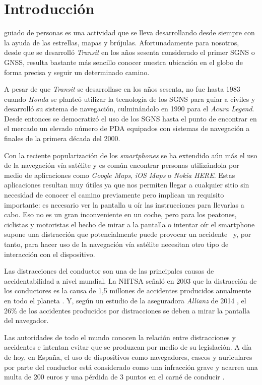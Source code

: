 \chapter{Introducción}
\label{chap:intro}

 guiado de personas es una actividad que se lleva desarrollando desde siempre con la
ayuda de las estrellas, mapas y brújulas. Afortunadamente para nosotros, desde que se desarrolló
\emph{Transit} en los años sesenta considerado el primer \acf{SGNS} o \acf{GNSS}, resulta
bastante más sencillo conocer nuestra ubicación en el globo de forma precisa y seguir un determinado
camino.

A pesar de que \emph{Transit} se desarrollase en los años sesenta, no fue hasta 1983 cuando
\emph{Honda} se planteó utilizar la tecnología de los \acs{SGNS} para guiar a civiles y desarrolló
su sistema de navegación, culminándolo en 1990 para el \emph{Acura Legend}. Desde entonces se
democratizó el uso de los \acs{SGNS} hasta el punto de encontrar en el mercado un elevado número de
\acf{PDA} equipados con sistemas de navegación a finales de la primera década del 2000.

Con la reciente popularización de los \emph{smartphones} se ha extendido aún más el uso de la
navegación vía satélite y es común encontrar personas utilizándola por medio de aplicaciones como
\emph{Google Maps}, \emph{iOS Maps} o \emph{Nokia HERE}. Estas aplicaciones resultan muy útiles ya
que nos permiten llegar a cualquier sitio sin necesidad de conocer el camino previamente pero
implican un requisito importante: es necesario ver la pantalla u oír las instrucciones para
llevarlas a cabo. Eso no es un gran inconveniente en un coche, pero para los peatones, ciclistas y
motoristas el hecho de mirar a la pantalla o intentar oír el smartphone supone una distracción que
potencialmente puede provocar un accidente~\cite{Valcarcel12} y, por tanto, para hacer uso de la
navegación vía satélite necesitan otro tipo de interacción con el dispositivo.

Las distracciones del conductor son una de las principales causas de accidentabilidad a nivel
mundial. La \acf{NHTSA} señaló en 2003 que la distracción de los conductores es la causa de 1,5
millones de accidentes producidos anualmente en todo el planeta \cite{RACC03}. Y, según un estudio
de la aseguradora \emph{Allianz} de 2014 \cite{Allianz14}, el 26\% de los accidentes producidos por
distracciones se deben a mirar la pantalla del navegador.

Las autoridades de todo el mundo conocen la relación entre distracciones y accidentes e intentan
evitar que se produzcan por medio de su legislación. A día de hoy, en España, el uso de dispositivos
como navegadores, cascos y auriculares por parte del conductor está considerado como una infracción
grave y acarrea una multa de 200 euros y una pérdida de 3 puntos en el carné de conducir
\cite{Serrano14} .

